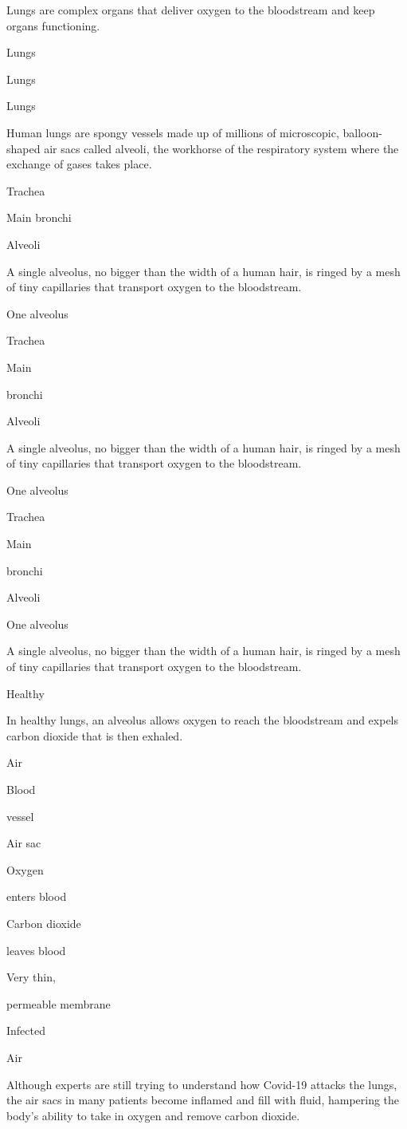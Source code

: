 Lungs are complex organs that deliver oxygen to the bloodstream and keep
organs functioning.

Lungs

Lungs

Lungs

Human lungs are spongy vessels made up of millions of microscopic,
balloon-shaped air sacs called alveoli, the workhorse of the respiratory
system where the exchange of gases takes place.

Trachea

Main bronchi

Alveoli

A single alveolus, no bigger than the width of a human hair, is ringed
by a mesh of tiny capillaries that transport oxygen to the bloodstream.

One alveolus

Trachea

Main

bronchi

Alveoli

A single alveolus, no bigger than the width of a human hair, is ringed
by a mesh of tiny capillaries that transport oxygen to the bloodstream.

One alveolus

Trachea

Main

bronchi

Alveoli

One alveolus

A single alveolus, no bigger than the width of a human hair, is ringed
by a mesh of tiny capillaries that transport oxygen to the bloodstream.

Healthy

In healthy lungs, an alveolus allows oxygen to reach the bloodstream and
expels carbon dioxide that is then exhaled.

Air

Blood

vessel

Air sac

Oxygen

enters blood

Carbon dioxide

leaves blood

Very thin,

permeable membrane

Infected

Air

Although experts are still trying to understand how Covid-19 attacks the
lungs, the air sacs in many patients become inflamed and fill with
fluid, hampering the body's ability to take in oxygen and remove carbon
dioxide.


